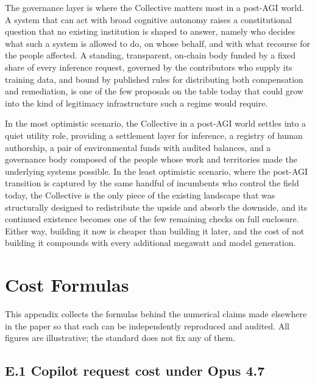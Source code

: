\documentclass[10pt,a4paper,twocolumn]{article}
\begin{document}
The governance layer is where the Collective matters most in a post-AGI world. A system that can act with broad cognitive autonomy raises a constitutional question that no existing institution is shaped to answer, namely who decides what such a system is allowed to do, on whose behalf, and with what recourse for the people affected. A standing, transparent, on-chain body funded by a fixed share of every inference request, governed by the contributors who supply its training data, and bound by published rules for distributing both compensation and remediation, is one of the few proposals on the table today that could grow into the kind of legitimacy infrastructure such a regime would require.

In the most optimistic scenario, the Collective in a post-AGI world settles into a quiet utility role, providing a settlement layer for inference, a registry of human authorship, a pair of environmental funds with audited balances, and a governance body composed of the people whose work and territories made the underlying systems possible. In the least optimistic scenario, where the post-AGI transition is captured by the same handful of incumbents who control the field today, the Collective is the only piece of the existing landscape that was structurally designed to redistribute the upside and absorb the downside, and its continued existence becomes one of the few remaining checks on full enclosure. Either way, building it now is cheaper than building it later, and the cost of not building it compounds with every additional megawatt and model generation.

\section{Cost Formulas}
\label{sec:appendix-formulas}

This appendix collects the formulas behind the numerical claims made elsewhere in the paper so that each can be independently reproduced and audited. All figures are illustrative; the standard does not fix any of them.

\subsection*{E.1 Copilot request cost under Opus 4.7}
\end{document}
